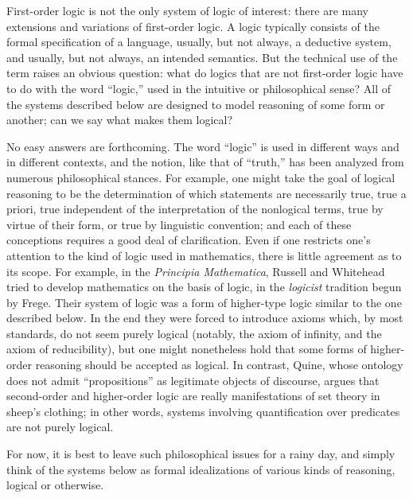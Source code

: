 \documentclass[../../../include/open-logic-section]{subfiles}
\begin{document}


First-order logic is not the only system of logic of interest: there
are many extensions and variations of first-order logic. A logic
typically consists of the formal specification of a language, usually,
but not always, a deductive system, and usually, but not always, an
intended semantics. But the technical use of the term raises an
obvious question: what do logics that are not first-order logic have
to do with the word ``logic,'' used in the intuitive or philosophical
sense? All of the systems described below are designed to model
reasoning of some form or another; can we say what makes them logical?

No easy answers are forthcoming. The word ``logic'' is used in
different ways and in different contexts, and the notion, like that of
``truth,'' has been analyzed from numerous philosophical stances. For
example, one might take the goal of logical reasoning to be the
determination of which statements are necessarily true, true a priori,
true independent of the interpretation of the nonlogical terms, true
by virtue of their form, or true by linguistic convention; and each of
these conceptions requires a good deal of clarification. Even if one
restricts one's attention to the kind of logic used in mathematics,
there is little agreement as to its scope. For example, in the
\textit{Principia Mathematica}, Russell and Whitehead tried to develop
mathematics on the basis of logic, in the {\em logicist} tradition
begun by Frege. Their system of logic was a form of higher-type logic
similar to the one described below. In the end they were forced to
introduce axioms which, by most standards, do not seem purely logical
(notably, the axiom of infinity, and the axiom of reducibility), but
one might nonetheless hold that some forms of higher-order reasoning
should be accepted as logical. In contrast, Quine, whose ontology does
not admit ``propositions'' as legitimate objects of discourse, argues
that second-order and higher-order logic are really manifestations of
set theory in sheep's clothing; in other words, systems involving
quantification over predicates are not purely logical.

For now, it is best to leave such philosophical issues for a rainy
day, and simply think of the systems below as formal idealizations of
various kinds of reasoning, logical or otherwise.
\end{document}
